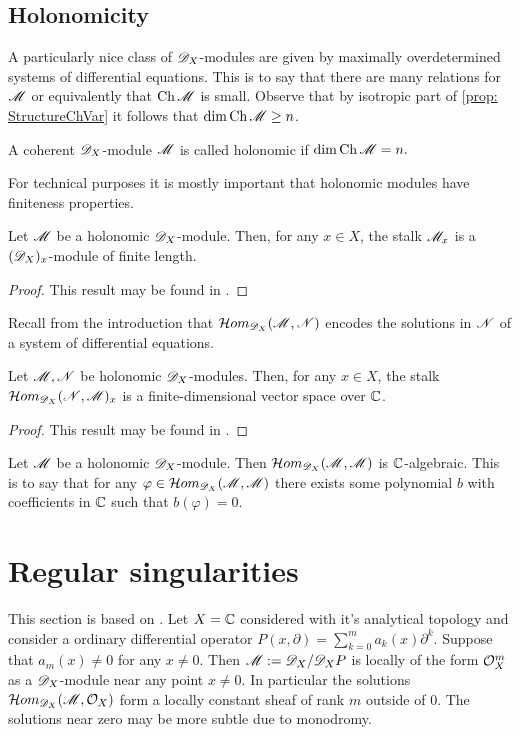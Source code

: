 \subsection{Holonomicity}
A particularly nice class of $\mathscr{D}_X$-modules are given by maximally overdetermined systems of differential equations.
This is to say that there are many relations for $\mathscr{M}$ or equivalently that $\operatorname{Ch}\mathscr{M}$ is small.
Observe that by isotropic part of \cref{prop: StructureChVar} it follows that $\dim \operatorname{Ch}\mathscr{M} \geq n$.
\begin{definition}
  A coherent $\mathscr{D}_X$-module $\mathscr{M}$ is called holonomic if
  $\dim \operatorname{Ch} \mathscr{M}  = n.$
\end{definition}
For technical purposes it is mostly important that holonomic modules have finiteness properties.
\begin{proposition}
  Let $\mathscr{M}$ be a holonomic $\mathscr{D}_X$-module. Then, for any $x\in X$, the stalk $\mathscr{M}_x$ is a $(\mathscr{D}_X)_x$-module of finite length.
\end{proposition}
\begin{proof}
  This result may be found in \cite[Chapter 4]{kashiwara2003d}.
\end{proof}
Recall from the introduction that $\mathcal{H}om_{\mathscr{D}_X}(\mathscr{M},\mathscr{N})$ encodes the solutions in $\mathscr{N}$ of a system of differential equations.
\begin{proposition}
  Let $\mathscr{M},\mathscr{N}$ be holonomic $\mathscr{D}_X$-modules. Then, for any $x\in X$, the stalk $\mathcal{H}om_{\mathscr{D}_X}(\mathscr{N},\mathscr{M})_x$ is a finite-dimensional vector space over $\mathbb{C}$.
\end{proposition}
\begin{proof}
  This result may be found in \cite[Chapter 4]{kashiwara2003d}.
\end{proof}
\begin{corollary}
  Let $\mathscr{M}$ be a holonomic $\mathscr{D}_X$-module. Then $\mathcal{H}om_{\mathscr{D}_X}(\mathscr{M},\mathscr{M})$ is $\mathbb{C}$-algebraic. This is to say that for any $\varphi \in\mathcal{H}om_{\mathscr{D}_X}(\mathscr{M},\mathscr{M}) $ there exists some polynomial $b$ with coefficients in $\mathbb{C}$ such that $b(\varphi)=0$.
\end{corollary}
\section{Regular singularities}
This section is based on \cite[Chapter 5]{kashiwara2003d}.
Let $X=\mathbb{C}$ considered with it's analytical topology and consider a ordinary differential operator
$P(x,\partial) = \sum_{k=0}^m a_k(x)\partial^k.$
Suppose that $a_m(x)\neq 0$ for any $x\neq 0$.
Then $\mathscr{M} :=\mathscr{D}_X/\mathscr{D}_X P$ is locally of the form $\mathcal{O}_X^m$ as a $\mathscr{D}_X$-module near any point $x\neq 0$.
In particular the solutions $\mathcal{H}om_{\mathscr{D}_X}(\mathscr{M},\mathcal{O}_X)$ form a locally constant sheaf of rank $m$ outside of $0$.
The solutions near zero may be more subtle due to monodromy.

